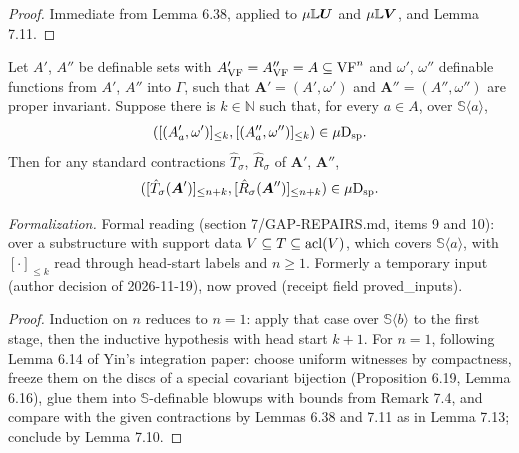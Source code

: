 \begin{proof}
Immediate from Lemma 6.38, applied to $\mu\mathbb{L} \boldsymbol{U}$ and $\mu\mathbb{L} \boldsymbol{V}$, and Lemma 7.11.
\end{proof}

\setcounter{theorem}{13}
\begin{lemma}
\label{isp-VF-fiberwise-contract}
\leanok
{}
Let $A'$, $A''$ be definable sets with $A'_{\mathrm{VF}} = A''_{\mathrm{VF}} = A \subseteq \mathrm{VF}^n$ and $\omega'$, $\omega''$ definable functions from $A'$, $A''$ into $\Gamma$, such that $\boldsymbol{A}' = (A', \omega')$ and $\boldsymbol{A}'' = (A'', \omega'')$ are proper invariant. Suppose there is $k \in \mathbb{N}$ such that, for every $a \in A$, over $\mathbb{S}\langle a \rangle$,\[ ([(A'_a, \omega')]_{\leq k}, [(A''_a, \omega'')]_{\leq k}) \in \mu\mathrm{D}_{\mathrm{sp}}. \]Then for any standard contractions $\hat T_\sigma$, $\hat R_\sigma$ of $\boldsymbol{A}'$, $\boldsymbol{A}''$,\[ ([\hat T_\sigma(\boldsymbol{A}')]_{\leq n+k}, [\hat R_\sigma(\boldsymbol{A}'')]_{\leq n+k}) \in \mu\mathrm{D}_{\mathrm{sp}}. \]

\emph{Formalization.} Formal reading (section 7/GAP-REPAIRS.md, items 9 and 10): over a substructure with support data $V \subseteq T \subseteq \operatorname{acl}(V)$, which covers $\mathbb{S}\langle a \rangle$, with $[\cdot]_{\leq k}$ read through head-start labels and $n \geq 1$. Formerly a temporary input (author decision of 2026-11-19), now proved (receipt field proved\_inputs).
\end{lemma}

\begin{proof}
\leanok
Induction on $n$ reduces to $n = 1$: apply that case over $\mathbb{S}\langle b \rangle$ to the first stage, then the inductive hypothesis with head start $k + 1$. For $n = 1$, following Lemma 6.14 of Yin's integration paper: choose uniform witnesses by compactness, freeze them on the discs of a special covariant bijection (Proposition 6.19, Lemma 6.16), glue them into $\mathbb{S}$-definable blowups with bounds from Remark 7.4, and compare with the given contractions by Lemmas 6.38 and 7.11 as in Lemma 7.13; conclude by Lemma 7.10.
\end{proof}

